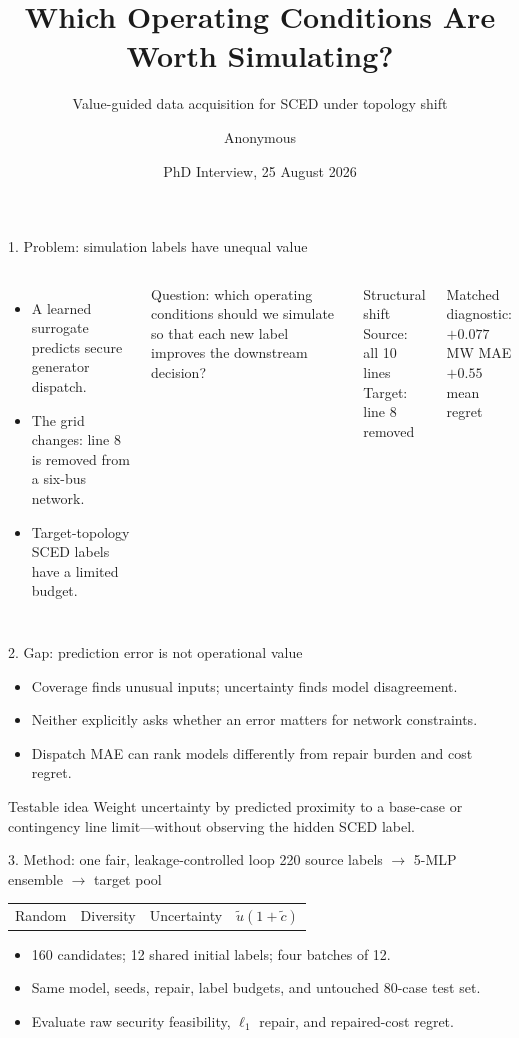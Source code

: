 \documentclass[aspectratio=169]{beamer}
\title{Which Operating Conditions Are Worth Simulating?}
\subtitle{Value-guided data acquisition for SCED under topology shift}
\author{Anonymous}
\date{PhD Interview, 25 August 2026}
\begin{document}
\begin{frame}{1. Problem: simulation labels have unequal value}
\begin{columns}[T]
\begin{itemize}
\item A learned surrogate predicts secure generator dispatch.
\item The grid changes: line 8 is removed from a six-bus network.
\item Target-topology SCED labels have a limited budget.
\end{itemize}
\vspace{.5em}
\alert{Question:} which operating conditions should we simulate so that each new label improves the downstream decision?
\begin{block}{Structural shift}
Source: all 10 lines\\[.5em]
Target: \alert{line 8 removed}
\end{block}
\vspace{.5em}
Matched diagnostic:\\
$+0.077$ MW MAE\\
$+0.55$ mean regret
\end{columns}
\end{frame}

\begin{frame}{2. Gap: prediction error is not operational value}
\begin{itemize}
\item Coverage finds unusual inputs; uncertainty finds model disagreement.
\item Neither explicitly asks whether an error matters for network constraints.
\item Dispatch MAE can rank models differently from repair burden and cost regret.
\end{itemize}
\begin{block}{Testable idea}
Weight uncertainty by predicted proximity to a base-case or contingency line limit---without observing the hidden SCED label.
\end{block}
\end{frame}

\begin{frame}{3. Method: one fair, leakage-controlled loop}
\centering
\Large 220 source labels $\rightarrow$ 5-MLP ensemble $\rightarrow$ target pool\\[.5em]
\normalsize
\begin{tabular}{llll}
Random & Diversity & Uncertainty & $\tilde u(1+\tilde c)$\\
\end{tabular}
\vspace{1em}
\begin{itemize}
\item 160 candidates; 12 shared initial labels; four batches of 12.
\item Same model, seeds, repair, label budgets, and untouched 80-case test set.
\item Evaluate raw security feasibility, $\ell_1$ repair, and repaired-cost regret.
\end{itemize}
\end{frame}
\end{document}
